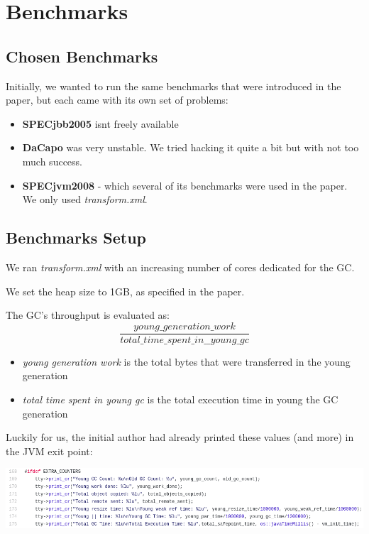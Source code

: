 \documentclass{article}
\begin{document}
 \newpage

 \section{Benchmarks}
 \subsection{Chosen Benchmarks}
 Initially, we wanted to run the same benchmarks that were introduced in the paper, but each came with its own set of problems:

 \begin{itemize}
   \item \textbf{SPECjbb2005} isnt freely available
   \item \textbf{DaCapo} was very unstable. We tried hacking it quite a bit but with not too much success.
   \item \textbf{SPECjvm2008} - which several of its benchmarks were used in the paper. We only used \textit{transform.xml}.
 \end{itemize}

 \subsection{Benchmarks Setup}
 We ran \textit{transform.xml} with an increasing number of cores dedicated for the GC.

 We set the heap size to 1GB, as specified in the paper.

 The GC's throughput is evaluated as:
 \begin{equation}
	 \frac{young\_generation\_work}{total\_time\_spent\_in\_\_young\_gc}
 \end{equation}

 \begin{itemize}
   \item \textit{young generation work} is the total bytes that were transferred in the young generation
   \item \textit{total time spent in young gc} is the total execution time in young the GC generation
 \end{itemize}

 Luckily for us, the initial author had already printed these values (and more) in the JVM exit point:

 \includegraphics[width=\textwidth]{gc-debug-prints.png}
\end{document}
